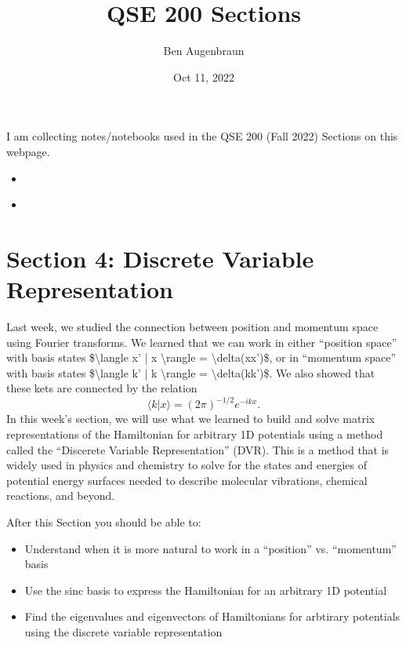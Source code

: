 \documentclass[letterpaper,10pt,english]{jupyterBook}
\title{QSE 200 Sections}
\date{Oct 11, 2022}
\author{Ben Augenbraun}
\begin{document}
\pagestyle{empty}
\sphinxmaketitle
\pagestyle{plain}
\sphinxtableofcontents
\pagestyle{normal}
\label{\detokenize{home::doc}}


\sphinxAtStartPar
I am collecting notes/notebooks used in the QSE 200 (Fall 2022) Sections on this webpage.
\begin{itemize}
\item {} 
\sphinxAtStartPar
{\hyperref[\detokenize{Section4_v2::doc}]{}}

\item {} 
\sphinxAtStartPar
{\hyperref[\detokenize{Section6_v2::doc}]{}}

\end{itemize}


\chapter{Section 4: Discrete Variable Representation}
\label{\detokenize{Section4_v2:section-4-discrete-variable-representation}}\label{\detokenize{Section4_v2::doc}}
\sphinxAtStartPar
Last week, we studied the connection between position and momentum space using Fourier transforms. We learned that we can work in either “position space” with basis states \$\textbackslash{}langle x’ | x \textbackslash{}rangle = \textbackslash{}delta(x\sphinxhyphen{}x’)\$, or in “momentum space” with basis states \$\textbackslash{}langle k’ | k \textbackslash{}rangle = \textbackslash{}delta(k\sphinxhyphen{}k’)\$. We also showed that these kets are connected by the relation
\label{equation:Section4_v2:3e903f6f-728b-4df2-9358-1b2011c57a21}\begin{equation}
\langle k | x \rangle = (2\pi)^{-1/2} e^{-i k x}.
\end{equation}
\sphinxAtStartPar
In this week’s section, we will use what we learned to build and solve matrix representations of the Hamiltonian for arbitrary 1D potentials using a method called the “Discerete Variable Representation” (DVR). This is a method that is widely used in physics and chemistry to solve for the states and energies of potential energy surfaces needed to describe molecular vibrations, chemical reactions, and beyond.

\sphinxAtStartPar
{}
After this Section you should be able to:
\begin{itemize}
\item {} 
\sphinxAtStartPar
Understand when it is more natural to work in a “position” vs. “momentum” basis

\item {} 
\sphinxAtStartPar
Use the sinc basis to express the Hamiltonian for an arbitrary 1D potential

\item {} 
\sphinxAtStartPar
Find the eigenvalues and eigenvectors of Hamiltonians for arbtirary potentials using the discrete variable representation

\end{itemize}
\end{document}
